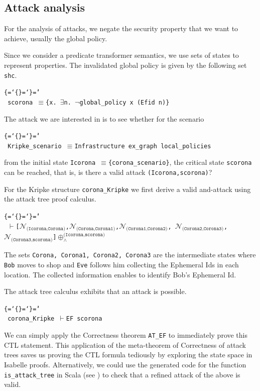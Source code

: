 \documentclass{llncs}
\newenvironment{ttbox}{\begin{alltt}\ttbraces\small\tt}%
                      {\end{alltt}}
\def\ttbraces{\let\.=\nobreak\chardef\{=`\{\chardef\}=`\}\chardef\|=`\\}
\newcommand\ttequiv{\mbox{{$\equiv$}}}
\newcommand\ttexists{\mbox{{$\exists$}}}
\newcommand\ttneg{\mbox{{$\neg$}}}
\newcommand\ttvdash{\mbox{{$\vdash$}}}
\newcommand{\ttcalN}[1]{\mbox{{${\mathcal{N}}_{\texttt{#1}}$}}}
\newcommand\ttattand[1]{\mbox{{$\oplus_{\wedge}^{#1}$}}}
\begin{document}
\subsection{Attack analysis}
\label{sec:ana}
For the analysis of attacks, we negate the security property that we want to achieve,
usually the global policy.

Since we consider a predicate transformer semantics, we use
sets of states to represent properties. 
The invalidated global policy is given by the following set \texttt{shc}.
\begin{ttbox}
 scorona \ttequiv \{x. \ttexists n. \ttneg global_policy x (Efid n)\}
\end{ttbox}
The attack we are interested in is to see whether for the scenario
\begin{ttbox}
 Kripke\_scenario \ttequiv  Infrastructure ex_graph local_policies 
\end{ttbox}
from the initial state \texttt{Icorona \ttequiv \{corona\_scenario\}},
the critical state \texttt{scorona} can be reached,
that is, is there a valid attack \texttt{(Icorona,scorona)}?

For the Kripke structure \texttt{corona\_Kripke}
we first derive a valid and-attack using the attack tree proof calculus.
\begin{ttbox}
  \ttvdash [\ttcalN{(Icorona,Corona)},\ttcalN{(Corona,Corona1)},\ttcalN{(Corona1,Corona2)},
             \ttcalN{(Corona2,Corona3)},\ttcalN{(Corona3,scorona)}]\ttattand{\texttt{(Icorona,scorona)}}
\end{ttbox}
The sets \texttt{Corona, Corona1, Corona2, Corona3} are the intermediate states where
\texttt{Bob} moves to shop and \texttt{Eve} follows him collecting the Ephemeral Ids in each location.
The collected information enables to identify Bob's Ephemeral Id.

The attack tree calculus \cite{kam:18b} exhibits that an attack is possible.
\begin{ttbox}
 corona_Kripke \ttvdash {\sf EF} scorona
\end{ttbox}
We can simply apply the Correctness theorem \texttt{AT\_EF} to 
immediately prove this CTL statement. This application of the meta-theorem 
of Correctness of attack trees saves us proving the CTL formula tediously 
by exploring the state space in Isabelle proofs. Alternatively, we could use 
the generated code for the function \texttt{is\_attack\_tree} in Scala 
(see \cite{kam:18b}) to check that a refined attack of the above is valid.
\end{document}
